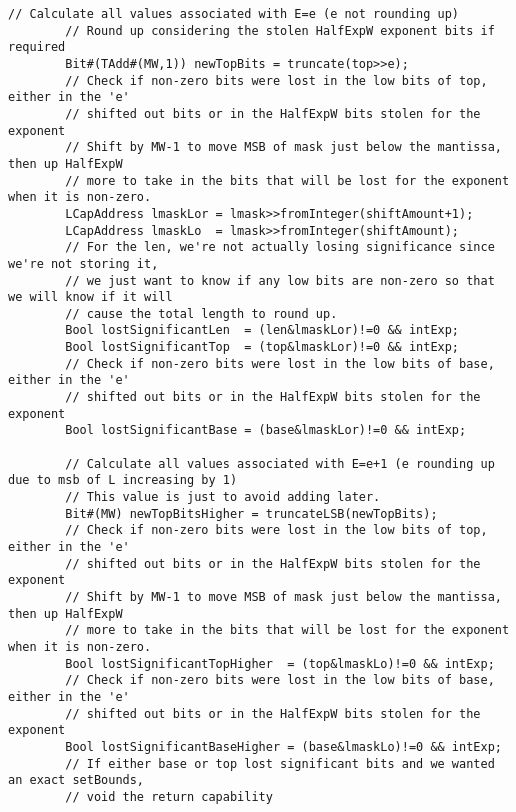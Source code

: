 \begin{lstlisting}[language=bluespec]
        // Calculate all values associated with E=e (e not rounding up)
        // Round up considering the stolen HalfExpW exponent bits if required
        Bit#(TAdd#(MW,1)) newTopBits = truncate(top>>e);
        // Check if non-zero bits were lost in the low bits of top, either in the 'e'
        // shifted out bits or in the HalfExpW bits stolen for the exponent
        // Shift by MW-1 to move MSB of mask just below the mantissa, then up HalfExpW
        // more to take in the bits that will be lost for the exponent when it is non-zero.
        LCapAddress lmaskLor = lmask>>fromInteger(shiftAmount+1);
        LCapAddress lmaskLo  = lmask>>fromInteger(shiftAmount);
        // For the len, we're not actually losing significance since we're not storing it,
        // we just want to know if any low bits are non-zero so that we will know if it will
        // cause the total length to round up.
        Bool lostSignificantLen  = (len&lmaskLor)!=0 && intExp;
        Bool lostSignificantTop  = (top&lmaskLor)!=0 && intExp;
        // Check if non-zero bits were lost in the low bits of base, either in the 'e'
        // shifted out bits or in the HalfExpW bits stolen for the exponent
        Bool lostSignificantBase = (base&lmaskLor)!=0 && intExp;

        // Calculate all values associated with E=e+1 (e rounding up due to msb of L increasing by 1)
        // This value is just to avoid adding later.
        Bit#(MW) newTopBitsHigher = truncateLSB(newTopBits);
        // Check if non-zero bits were lost in the low bits of top, either in the 'e'
        // shifted out bits or in the HalfExpW bits stolen for the exponent
        // Shift by MW-1 to move MSB of mask just below the mantissa, then up HalfExpW
        // more to take in the bits that will be lost for the exponent when it is non-zero.
        Bool lostSignificantTopHigher  = (top&lmaskLo)!=0 && intExp;
        // Check if non-zero bits were lost in the low bits of base, either in the 'e'
        // shifted out bits or in the HalfExpW bits stolen for the exponent
        Bool lostSignificantBaseHigher = (base&lmaskLo)!=0 && intExp;
        // If either base or top lost significant bits and we wanted an exact setBounds,
        // void the return capability


\end{lstlisting}
